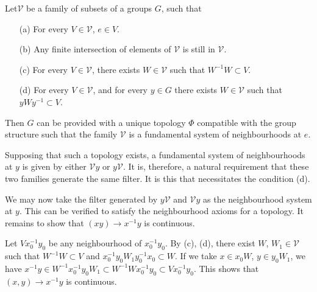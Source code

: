 \begin{proposition}\label{chap1-prop1}%
Let\pageoriginale $\mathscr{V}$ be a family of subsets of a groups
$G$, such that 
\begin{enumerate}
\item[\rm(a)] For every $V \in \mathscr{V}$, $e \in V$. 

\item[\rm(b)] Any finite intersection of elements of $\mathscr{V}$ is
  still in $\mathscr{V}$. 

\item[\rm(c)] For every $V \in \mathscr{V}$, there exists $W \in
  \mathscr{V}$ such that $W^{-1}W \subset V$. 

\item[\rm(d)] For every $V \in \mathscr{V}$, and for every $y \in G$
  there exists $W \in \mathscr{V}$ such that $y W y^{-1}\subset V$. 
\end{enumerate}
\end{proposition}


Then $G$ can be provided with a unique topology $\Phi$ compatible with
the group structure such that the family $\mathscr{V}$ is a fundamental
system of neighbourhoods at $e$. 

Supposing that such a topology exists, a fundamental system of
neighbourhoods at $y$ is given by either $\mathscr{V} y$ or $y
\mathscr{V}$. It is, therefore, a natural requirement that these two
families generate the same filter. It is this that necessitates the
condition (d). 

We may now take the filter generated by $y \mathscr{V}$ and $\mathscr{V}
y$ as the neighbourhood system at $y$. This can be verified to satisfy
the neighbourhood axioms for a topology. It remains to show that $(xy)
\to x^{-1}y$ is continuous. 
 
Let $V x^{-1}_0 y_0$ be any neighbourhood of $x^{-1}_0 y_0$. By (c),
(d), there exist $W$, $W_1 \in \mathscr{V}$ such that $W^{-1}W \subset V$
and $x^{-1}_0 y_0 W_1 y^{-1}_0 x_0 \subset W$. If we take $x \in x_0
W$, $y \in y_0 W_1$, we have $x^{-1}y \in W^{-1} x^{-1}_0 y_0 W_1
\subset W^{-1}W x^{-1}_0 y_0 \subset V x^{-1}_0 y_0$. This shows that
$(x , y)\to x^{-1}y$ is continuous. 

